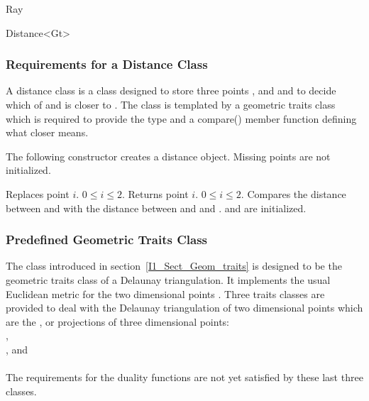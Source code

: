 \begin{ccClass}{Ray}
\end{ccClass}



\begin{ccClassTemplate} {Distance<Gt>}
\subsubsection{Requirements for a Distance Class}

A distance  class is a class designed to store three points
,  and  and to decide which of 
and  is closer to . 
The class is templated by a geometric traits class 
which is required to provide the  type
and a compare() member function 
defining what closer means.

\ccTypes
{}

\ccCreation

The following constructor creates a distance object. Missing points are not initialized.

\ccOperations
{}

{Replaces point $i$. \ccPrecond $0\leq i \leq 2$.}
\ccGlue
{}
{Returns point $i$. \ccPrecond $0\leq i \leq 2$.}
{Compares the distance between  and 
 with the distance between  and and .
 \ccPrecond {} and  are initialized.}

\end{ccClassTemplate}



\subsubsection{Predefined Geometric Traits Class}
The class 
introduced in section~\ref{I1_Sect_Geom_traits} is 
 designed to be 
the geometric traits class of a Delaunay triangulation.
It implements the usual Euclidean metric
for the  two dimensional points .
Three traits classes are provided to deal with
the Delaunay triangulation of two dimensional points which are
the ,  or  projections of three dimensional points:\\
,\\
, and\\
 \\
The requirements for the duality functions are not yet satisfied by
these last three classes.

